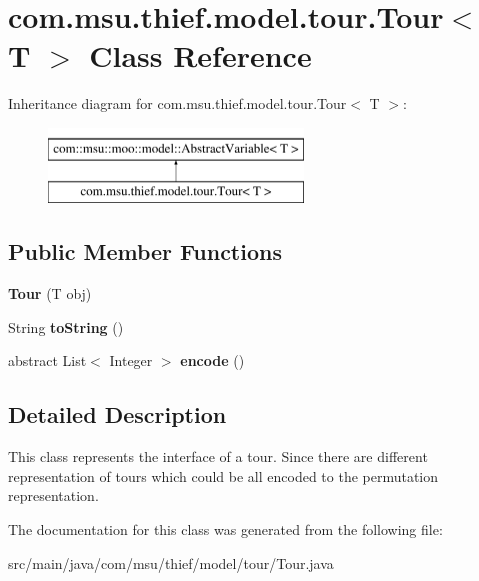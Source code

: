 \hypertarget{classcom_1_1msu_1_1thief_1_1model_1_1tour_1_1Tour_3_01T_01_4}{\section{com.\-msu.\-thief.\-model.\-tour.\-Tour$<$ T $>$ Class Reference}
\label{classcom_1_1msu_1_1thief_1_1model_1_1tour_1_1Tour_3_01T_01_4}
}
Inheritance diagram for com.\-msu.\-thief.\-model.\-tour.\-Tour$<$ T $>$\-:\begin{figure}[H]
\begin{center}
\leavevmode
\includegraphics[height=2.000000cm]{classcom_1_1msu_1_1thief_1_1model_1_1tour_1_1Tour_3_01T_01_4}
\end{center}
\end{figure}
\subsection*{Public Member Functions}
\begin{DoxyCompactItemize}
\item 
\hypertarget{classcom_1_1msu_1_1thief_1_1model_1_1tour_1_1Tour_3_01T_01_4_a5d6f18d12c1ed867e4433c4f89ac0063}{{\bfseries Tour} (T obj)}\label{classcom_1_1msu_1_1thief_1_1model_1_1tour_1_1Tour_3_01T_01_4_a5d6f18d12c1ed867e4433c4f89ac0063}

\item 
\hypertarget{classcom_1_1msu_1_1thief_1_1model_1_1tour_1_1Tour_3_01T_01_4_a078a8d0928325d814d428dcd3b71e3a7}{String {\bfseries to\-String} ()}\label{classcom_1_1msu_1_1thief_1_1model_1_1tour_1_1Tour_3_01T_01_4_a078a8d0928325d814d428dcd3b71e3a7}

\item 
\hypertarget{classcom_1_1msu_1_1thief_1_1model_1_1tour_1_1Tour_3_01T_01_4_a85f94456f78ae727eaaa64f921bb0c07}{abstract List$<$ Integer $>$ {\bfseries encode} ()}\label{classcom_1_1msu_1_1thief_1_1model_1_1tour_1_1Tour_3_01T_01_4_a85f94456f78ae727eaaa64f921bb0c07}

\end{DoxyCompactItemize}


\subsection{Detailed Description}
This class represents the interface of a tour. Since there are different representation of tours which could be all encoded to the permutation representation. 

The documentation for this class was generated from the following file\-:\begin{DoxyCompactItemize}
\item 
src/main/java/com/msu/thief/model/tour/Tour.\-java\end{DoxyCompactItemize}
